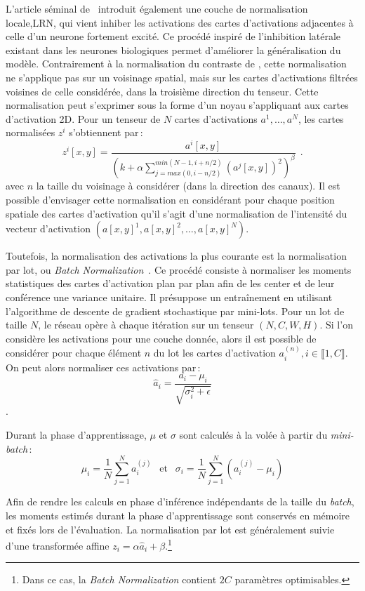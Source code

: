 L'article séminal de~\citet{krizhevsky_imagenet_2012} introduit également une couche de normalisation locale,\gls{LRN}, qui vient inhiber les activations des cartes d'activations adjacentes à celle d'un neurone fortement excité. Ce procédé inspiré de l'inhibition latérale existant dans les neurones biologiques permet d'améliorer la généralisation du modèle. Contrairement à la normalisation du contraste de \citet{jarrett_what_2009}, cette normalisation ne s'applique pas sur un voisinage spatial, mais sur les cartes d'activations filtrées voisines de celle considérée, dans la troisième direction du tenseur. Cette normalisation peut s'exprimer sous la forme d'un noyau s'appliquant aux cartes d'activation 2D. Pour un tenseur de $N$ cartes d'activations $a^1,\dots,a^N$, les cartes normalisées $z^i$ s'obtiennent par\,:
$$z^i[x,y] = \frac{a^i[x,y]}{\left(k + \alpha \sum_{j=max(0, i-n/2)}^{min(N-1, i+n/2)} (a^j[x,y])^2  \right)^\beta}~~.$$
avec $n$ la taille du voisinage à considérer (dans la direction des canaux). Il est possible d'envisager cette normalisation en considérant pour chaque position spatiale des cartes d'activation qu'il s'agit d'une normalisation de l'intensité du vecteur d'activation $(a[x,y]^1, a[x,y]^2, \dots, a[x,y]^N)$.

Toutefois, la normalisation des activations la plus courante est la normalisation par lot, ou \emph{Batch Normalization}~\cite{ioffe_batch_2015}. Ce procédé consiste à normaliser les moments statistiques des cartes d'activation plan par plan afin de les center et de leur conférence une variance unitaire. Il présuppose un entraînement en utilisant l'algorithme de descente de gradient stochastique par mini-lots. Pour un lot de taille $N$, le réseau opère à chaque itération sur un tenseur $(N, C, W, H)$. Si l'on considère les activations pour une couche donnée, alors il est possible de considérer pour chaque élément $n$ du lot les cartes d'activation $a^{(n)}_i, i \in \llbracket 1,C \rrbracket$. On peut alors normaliser ces activations par\,:
$$\hat{a}_i = \frac{a_i - \mu_i}{\sqrt{\sigma_i^2 + \epsilon}}$$.

Durant la phase d'apprentissage, $\mu$ et $\sigma$ sont calculés à la volée à partir du \emph{mini-batch}\,:
$$\mu_i = \frac{1}{N} \sum_{j=1}^N a_i^{(j)}~~\text{ et }~~\sigma_i = \frac{1}{N} \sum_{j=1}^N (a_i^{(j)} - \mu_i)$$

Afin de rendre les calculs en phase d'inférence indépendants de la taille du \emph{batch}, les moments estimés durant la phase d'apprentissage sont conservés en mémoire et fixés lors de l'évaluation. La normalisation par lot est généralement suivie d'une transformée affine $z_i = \alpha \hat{a}_i + \beta$.\footnote{Dans ce cas, la \emph{Batch Normalization} contient $2C$ paramètres optimisables.}


